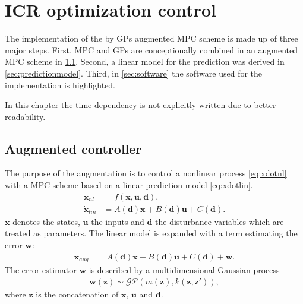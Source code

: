 \chapter{ICR optimization control}
\label{cha:ICR}
The implementation of the by GPs augmented MPC scheme is made up of three major steps.
First, MPC and GPs are conceptionally combined in an augmented MPC scheme in \cref{sec:augmentedcontroller}.
Second, a linear model for the prediction was derived in \cref{sec:predictionmodel}.
Third, in \cref{sec:software} the software used for the implementation is highlighted.

In this chapter the time-dependency is not explicitly written due to better readability.

\section{Augmented controller}
\label{sec:augmentedcontroller}
The purpose of the augmentation is to control a nonlinear process \eqref{eq:xdotnl} with a MPC scheme based on a linear prediction model \eqref{eq:xdotlin}.
\begin{align}
\dot{\mathbf{x}}_{nl} &= f \left( \mathbf{x},\mathbf{u},\mathbf{d} \right) \label{eq:xdotnl},\\
\dot{\mathbf{x}}_{lin} &= A \left( \mathbf{d} \right) \mathbf{x} + B \left( \mathbf{d} \right) \mathbf{u} + C \left( \mathbf{d} \right). \label{eq:xdotlin}
\end{align}
$\mathbf{x}$ denotes the states, $\mathbf{u}$ the inputs and $\mathbf{d}$ the disturbance variables which are treated as parameters.
The linear model is expanded with a term estimating the error $\mathbf{w}$:
\begin{align}
\dot{\mathbf{x}}_{aug} &= A \left( \mathbf{d} \right) \mathbf{x} + B \left( \mathbf{d} \right) \mathbf{u} + C \left( \mathbf{d} \right) + \mathbf{w}. \label{eq:xdotaug}
\end{align}
The error estimator $\mathbf{w}$ is described by a multidimensional Gaussian process
\begin{align}
\mathbf{w} \left(\mathbf{z}\right) \sim \mathcal{GP}\left( m \left(\mathbf{z} \right),k \left(\mathbf{z},\mathbf{z}' \right) \right),
\end{align}
where $\mathbf{z}$ is the concatenation of $\mathbf{x}$, $\mathbf{u}$ and $\mathbf{d}$.

